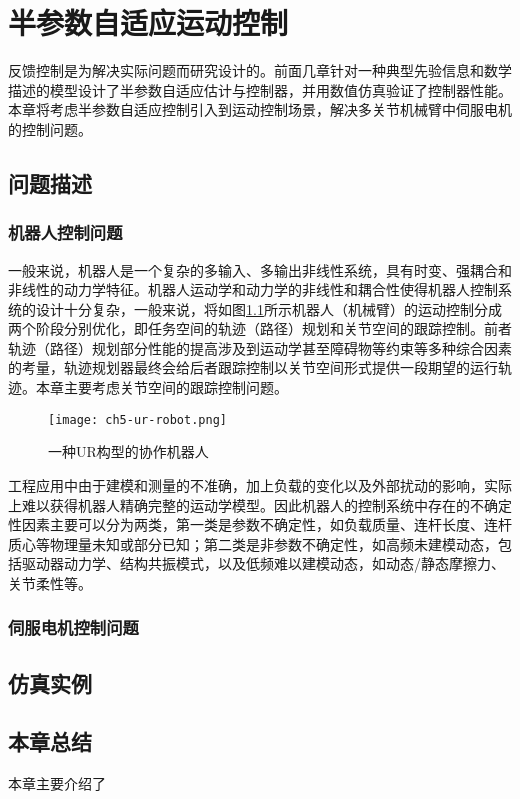 \chapter{半参数自适应运动控制}\label{chap:5}
反馈控制是为解决实际问题而研究设计的。前面几章针对一种典型先验信息和数学描述的模型设计了半参数自适应估计与控制器，并用数值仿真验证了控制器性能。本章将考虑半参数自适应控制引入到运动控制场景，解决多关节机械臂中伺服电机的控制问题。
\section{问题描述}
\subsection{机器人控制问题}
一般来说，机器人是一个复杂的多输入、多输出非线性系统，具有时变、强耦合和非线性的动力学特征。机器人运动学和动力学的非线性和耦合性使得机器人控制系统的设计十分复杂，一般来说，将如图\ref{fig.robot}所示机器人（机械臂）的运动控制分成两个阶段分别优化，即任务空间的轨迹（路径）规划和关节空间的跟踪控制。前者轨迹（路径）规划部分性能的提高涉及到运动学甚至障碍物等约束等多种综合因素的考量，轨迹规划器最终会给后者跟踪控制以关节空间形式提供一段期望的运行轨迹。本章主要考虑关节空间的跟踪控制问题。

\begin{figure}[!htb]
	\centering
	\texttt{[image: ch5-ur-robot.png]}\\	 %
	\caption{一种UR构型的协作机器人}
	\label{fig.robot}
\end{figure}

工程应用中由于建模和测量的不准确，加上负载的变化以及外部扰动的影响，实际上难以获得机器人精确完整的运动学模型。因此机器人的控制系统中存在的不确定性因素主要可以分为两类，第一类是参数不确定性，如负载质量、连杆长度、连杆质心等物理量未知或部分已知；第二类是非参数不确定性，如高频未建模动态，包括驱动器动力学、结构共振模式，以及低频难以建模动态，如动态/静态摩擦力、关节柔性等。

\subsection{伺服电机控制问题}

\section{仿真实例}

\section{本章总结}
本章主要介绍了